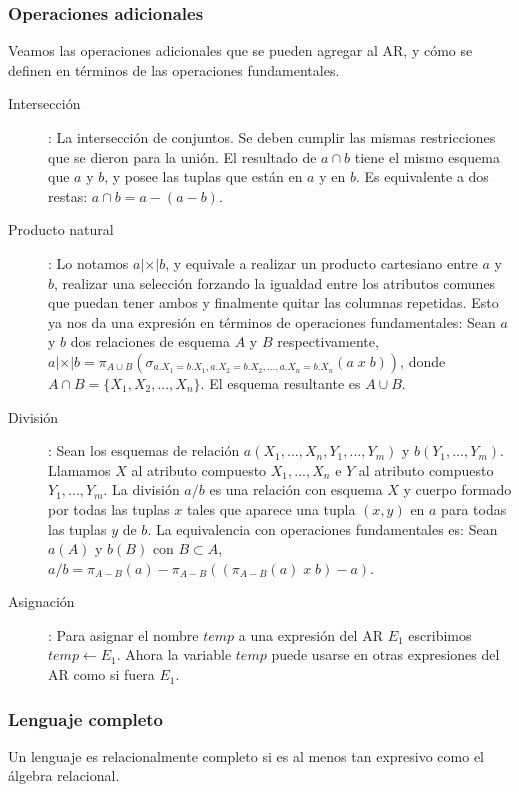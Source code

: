 \documentclass[a4paper]{article}
\begin{document}
\subsubsection{Operaciones adicionales}
Veamos las operaciones adicionales que se pueden agregar al AR, y c\'omo se definen en
t\'erminos de las operaciones fundamentales.
\begin{description}
    \item[Intersecci\'on]: La intersecci\'on de conjuntos. Se deben cumplir las mismas
    restricciones que se dieron para la uni\'on. El resultado de $a \cap b$ tiene el mismo
    esquema que $a$ y $b$, y posee las tuplas que est\'an en $a$ y en $b$. Es equivalente
    a dos restas: $a \cap b = a - (a - b)$.
    \item[Producto natural]: Lo notamos $a |\times| b$, y equivale a realizar un producto
    cartesiano entre $a$ y $b$, realizar una selecci\'on forzando la igualdad entre los
    atributos comunes que puedan tener ambos y finalmente quitar las columnas repetidas.
    Esto ya nos da una expresi\'on en t\'erminos de operaciones fundamentales: Sean $a$ y
    $b$ dos relaciones de esquema $A$ y $B$ respectivamente,
    $a |\times| b = \pi_{A \cup B}(\sigma_{a.X_{1} = b.X_{1}, a.X_{2} = b.X_{2}, ..., a.X_{n} =
    b.X_{n}}(a\; x\; b)) $, donde $A \cap B = \{X_{1}, X_{2}, ..., X_{n}\}$. El esquema
    resultante es $A \cup B$.
    \item[Divisi\'on]: Sean los esquemas de relaci\'on $a(X_{1},...,X_{n},Y_{1},...,Y_{m})$
    y $b(Y_{1},...,Y_{m})$. Llamamos $X$ al atributo compuesto $X_{1},...,X_{n}$ e $Y$ al
    atributo compuesto $Y_{1},...,Y_{m}$. La divisi\'on $a / b$ es una relaci\'on con
    esquema $X$ y cuerpo formado por todas las tuplas $x$ tales que aparece una tupla $(x,y)$
    en $a$ para todas las tuplas $y$ de $b$. La equivalencia con operaciones fundamentales
    es: Sean $a(A)$ y $b(B)$ con $B \subset A$, $a / b = \pi_{A-B}(a) - \pi_{A-B}((\pi_{A-B}(a)
    \; x\; b) - a)$.
    \item[Asignaci\'on]: Para asignar el nombre $temp$ a una expresi\'on del AR $E_{1}$
    escribimos $temp \leftarrow E_{1}$. Ahora la variable $temp$ puede usarse en otras
    expresiones del AR como si fuera $E_{1}$.
\end{description}

\subsubsection{Lenguaje completo}
Un lenguaje es relacionalmente completo si es al menos tan expresivo como el \'algebra
relacional.
\end{document}
